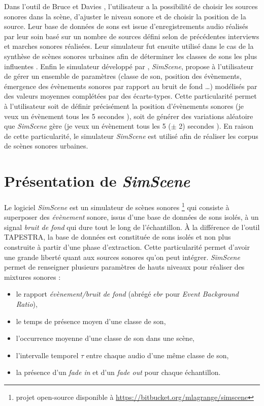 Dans l'outil de Bruce et Davies \cite{bruce_development_2009}, l'utilisateur a la possibilité de choisir les sources sonores dans la scène, d'ajuster le niveau sonore et de choisir la position de la source. Leur base de données de sons est issue d'enregistrements audio réalisés par leur soin basé sur un nombre de sources défini selon de précédentes interviews et marches sonores réalisées. Leur simulateur fut ensuite utilisé dans le cas de la synthèse de scènes sonores urbaines afin de déterminer les classes de sons les plus influentes \cite{davies2014soundscape}.
Enfin le simulateur développé par \cite{lagrange2015evaluation}, \textit{SimScene}, propose à l'utilisateur de gérer un ensemble de paramètres (classe de son, position des évènements, émergence des évènements sonores par rapport au bruit de fond \dots) modélisés par des valeurs moyennes complétées par des écarts-types.
Cette particularité permet à l'utilisateur soit de définir précisément la position d'évènements sonores (\og je veux un évènement tous les 5 secondes \fg{}), soit de générer des variations aléatoire que \textit{SimScene} gère (\og je veux un évènement tous les 5 ($\pm$ 2) secondes \fg{}). En raison de cette particularité, le simulateur \textit{SimScene} est utilisé afin de réaliser les corpus de scènes sonores urbaines.

\section{Présentation de \textit{SimScene}}
Le logiciel \textit{SimScene} \cite{rossignol_simscene_2015} est un simulateur de scènes sonores \footnote{projet open-source disponible à \url{https://bitbucket.org/mlagrange/simscene}} qui consiste à superposer des \textit{évènement} sonore, issus d'une base de données de sons isolés, à un signal \textit{bruit de fond} qui dure tout le long de l'échantillon. À la différence de l'outil TAPESTRA, la base de données est constituée de sons isolés et non plus construite à partir d'une phase d'extraction. Cette particularité permet d'avoir une grande liberté quant aux sources sonores qu'on peut intégrer. \textit{SimScene} permet de renseigner plusieurs paramètres de hauts niveaux pour réaliser des mixtures sonores :

\begin{itemize}
\item le rapport \textit{évènement/bruit de fond} (abrégé $ebr$ pour \textit{Event Background Ratio}),
\item le temps de présence moyen d'une classe de son,
\item l'occurrence moyenne d'une classe de son dans une scène,
\item l'intervalle temporel $\tau$ entre chaque audio d'une même classe de son,
\item la présence d'un \textit{fade in} et d'un \textit{fade out} pour chaque échantillon.\\
\end{itemize}

